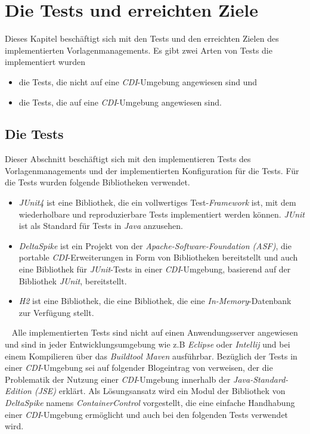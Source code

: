 \chapter{Die Tests und erreichten Ziele}
\label{cha:Analyse}
Dieses Kapitel beschäftigt sich mit den Tests und den erreichten Zielen des implementierten Vorlagenmanagements. Es gibt zwei Arten von Tests die implementiert wurden
\begin{itemize}
	\item die Tests, die nicht auf eine \emph{CDI}-Umgebung angewiesen sind und 
	\item die Tests, die auf eine \emph{CDI}-Umgebung angewiesen sind.
\end{itemize}

\section{Die Tests}
Dieser Abschnitt beschäftigt sich mit den implementieren Tests des Vorlagenmanagements und der implementierten Konfiguration für die Tests. Für die Tests wurden folgende Bibliotheken verwendet.
\begin{itemize}
	\item\emph{JUnit4}
	\newline
	ist eine Bibliothek, die ein vollwertiges Test-\emph{Framework} ist, mit dem wiederholbare und reproduzierbare Tests implementiert werden können. \emph{JUnit} ist als Standard für Tests in \emph{Java} anzusehen.
	\item\emph{DeltaSpike}
	\newline
	ist ein Projekt von der \emph{Apache-Software-Foundation (ASF)}, die portable \emph{CDI}-Erweiterungen in Form von Bibliotheken bereitstellt und auch eine Bibliothek für \emph{JUnit}-Tests in einer \emph{CDI}-Umgebung, basierend auf der Bibliothek \emph{JUnit}, bereitstellt.
	\item\emph{H2}
	\newline
	ist eine Bibliothek, die eine Bibliothek, die eine \emph{In-Memory}-Datenbank zur Verfügung stellt.  
\end{itemize}
\ \newline
Alle implementierten Tests sind nicht auf einen Anwendungsserver angewiesen und sind in jeder Entwicklungsumgebung wie z.B \emph{Eclipse} oder \emph{Intellij} und bei einem Kompilieren über das \emph{Buildtool Maven} ausführbar.
\newline
\newline
Bezüglich der Tests in einer \emph{CDI}-Umgebung sei auf folgender Blogeintrag von \cite{strubergBlog} verweisen, der die Problematik der Nutzung einer \emph{CDI}-Umgebung innerhalb der \emph{Java-Standard-Edition (JSE)} erklärt. Als Lösungsansatz wird ein Modul der Bibliothek von \emph{DeltaSpike} namens \emph{ContainerControl} vorgestellt, die eine einfache Handhabung einer \emph{CDI}-Umgebung ermöglicht und auch bei den folgenden Tests verwendet wird.
